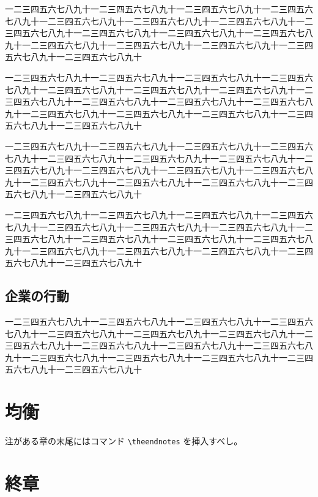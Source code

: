 \documentclass[uplatex,a4j,11pt]{jsarticle}
\renewcommand{\footnote}{\endnote}     %
\theoremstyle{roman}
\begin{document}
一二三四五六七八九十一二三四五六七八九十一二三四五六七八九十一二三四五六七八九十一二三四五六七八九十一二三四五六七八九十一二三四五六七八九十一二三四五六七八九十一二三四五六七八九十一二三四五六七八九十一二三四五六七八九十一二三四五六七八九十一二三四五六七八九十一二三四五六七八九十一二三四五六七八九十一二三四五六七八九十

一二三四五六七八九十一二三四五六七八九十一二三四五六七八九十一二三四五六七八九十一二三四五六七八九十一二三四五六七八九十一二三四五六七八九十一二三四五六七八九十一二三四五六七八九十一二三四五六七八九十一二三四五六七八九十一二三四五六七八九十一二三四五六七八九十一二三四五六七八九十一二三四五六七八九十一二三四五六七八九十

一二三四五六七八九十一二三四五六七八九十一二三四五六七八九十一二三四五六七八九十一二三四五六七八九十一二三四五六七八九十一二三四五六七八九十一二三四五六七八九十一二三四五六七八九十一二三四五六七八九十一二三四五六七八九十一二三四五六七八九十一二三四五六七八九十一二三四五六七八九十一二三四五六七八九十一二三四五六七八九十

一二三四五六七八九十一二三四五六七八九十一二三四五六七八九十一二三四五六七八九十一二三四五六七八九十一二三四五六七八九十一二三四五六七八九十一二三四五六七八九十一二三四五六七八九十一二三四五六七八九十一二三四五六七八九十一二三四五六七八九十一二三四五六七八九十一二三四五六七八九十一二三四五六七八九十一二三四五六七八九十

\subsection{企業の行動}

一二三四五六七八九十一二三四五六七八九十一二三四五六七八九十一二三四五六七八九十一二三四五六七八九十一二三四五六七八九十一二三四五六七八九十一二三四五六七八九十一二三四五六七八九十一二三四五六七八九十一二三四五六七八九十一二三四五六七八九十一二三四五六七八九十一二三四五六七八九十一二三四五六七八九十一二三四五六七八九十


\theendnotes %
\section{均衡}

注がある章の末尾にはコマンド \verb#\theendnotes# を挿入すべし\footnote{章末注は節として扱います。}。


\theendnotes %
\section{終章}
\end{document}
